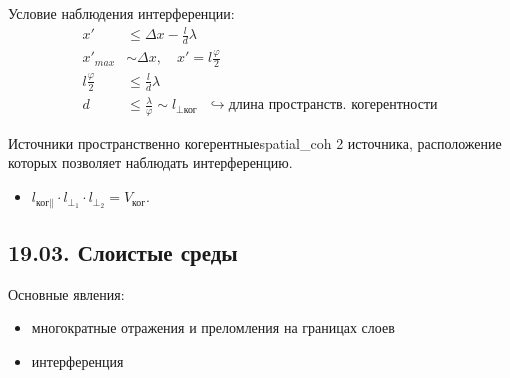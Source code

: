 Условие наблюдения интерференции:
\begin{align*}
	x' &\le \Delta x - \frac{l}{d}\lambda \\
	x'_{max} &\sim \Delta x, \quad x' = l \frac{\varphi}{2} \\
	l\frac{\varphi}{2} &\le \frac{l}{d}\lambda \\
	d &\le \frac{\lambda}{\varphi} \sim l_{\perp\text{ког}} \text{ } \hookrightarrow \text{длина пространств. когерентности}
\end{align*}

\begin{definition}{Источники пространственно когерентные}{spatial_coh}
	2 источника, расположение которых позволяет наблюдать интерференцию.
\end{definition}

\begin{itemize}
	\item $l_{\text{ког}\parallel} \cdot l_{\perp_1} \cdot l_{\perp_2} = V_{\text{ког}}$.
\end{itemize}

\subsection{19.03. Слоистые среды}

Основные явления:
\begin{itemize}
	\item многократные отражения и преломления на границах слоев
	\item интерференция
\end{itemize}

